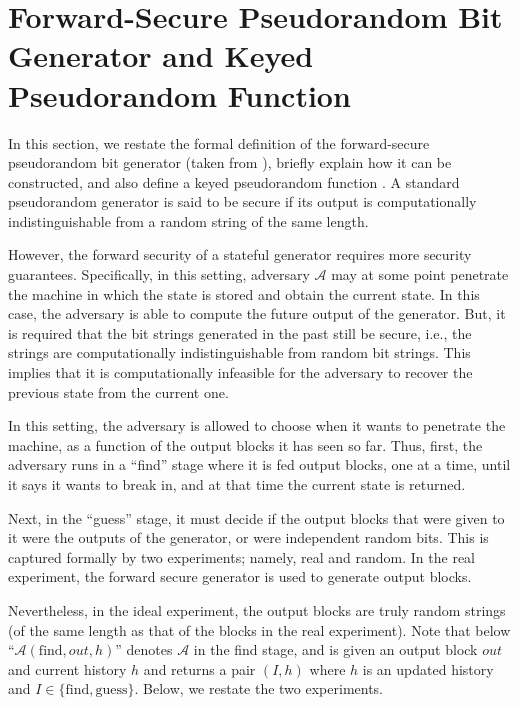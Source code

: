 

\section{Forward-Secure Pseudorandom Bit Generator and Keyed Pseudorandom Function}\label{app:def-FS-PRG}

In this section, we restate the formal definition of the forward-secure pseudorandom bit generator (taken from \cite{BellareY03}), briefly explain how it can be constructed, and also define a keyed pseudorandom function \prf. A standard pseudorandom generator is said to be secure if its output is computationally indistinguishable from a random string of the same length. 

However, the forward security of a stateful generator requires more security guarantees. Specifically, in this setting,  adversary $\mathcal{A}$ may at some point penetrate the machine in which the state is stored and obtain the current state. In this case, the adversary is able to compute the future output of the generator. But, it is required that the bit strings generated in the past still be secure, i.e., the strings are computationally indistinguishable from random bit strings. This implies that it is computationally infeasible for the adversary to recover the previous state from the current one. 





In this setting, the adversary is allowed to choose when it wants to penetrate the machine, as a function of the output blocks it has seen so far. Thus, first, the adversary runs in a ``find'' stage where it is fed output blocks, one at a time, until it says it wants to break in, and at that time the current state is returned.  

Next, in the ``guess'' stage, it must decide if the output blocks that were given to it were the outputs of the generator, or were independent random bits. This is captured formally by two experiments; namely, real and random. In the real experiment, the forward secure generator is used to generate output blocks. 

Nevertheless, in the ideal experiment, the output blocks are truly random strings (of the same length as that of the blocks in the real experiment). Note that below ``$\mathcal{A}(\text{find}, out, h)$'' denotes $\mathcal{A}$ in the find stage, and is given an output block $out$ and current history $h$ and returns a pair $(I, h)$ where $h$ is an updated history and $I \in\{\text{find}, \text{guess}\}$. Below, we restate the two experiments. 






